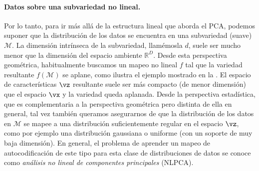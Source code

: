 \documentclass[../../book-main_es.tex]{subfiles}
\begin{document}
\paragraph{Datos sobre una subvariedad no lineal.} Por lo tanto, para ir más allá de la
estructura lineal que aborda el PCA, podemos suponer que la distribución de los datos
se encuentra en una subvariedad (suave) $\mathcal{M}$. La
dimensión intrínseca de la subvariedad, llamémosla $d$, suele ser mucho
menor que la
dimensión del espacio ambiente $\mathbb{R}^D$. Desde esta perspectiva geométrica,
habitualmente buscamos un mapeo no lineal $f$ tal que
la variedad resultante
$f(\mathcal{M})$ se aplane, como ilustra el ejemplo mostrado en la
. El espacio de características $\vz$ resultante
suele ser
más compacto (de menor dimensión) que el espacio $\vx$ y la
variedad queda aplanada.
Desde la perspectiva estadística, que es complementaria a la perspectiva geométrica
pero distinta de ella en general, tal vez también queramos asegurarnos de que la distribución de los datos
en $\mathcal{M}$ se mapee a una distribución suficientemente regular
en el espacio $\vz$, como por ejemplo una distribución gaussiana o uniforme (con
un soporte de muy baja dimensión).
En general, el problema de aprender un mapeo de autocodificación de este tipo para esta clase
de distribuciones de datos se conoce como {\em análisis no lineal de componentes principales}
(NLPCA).
\end{document}
